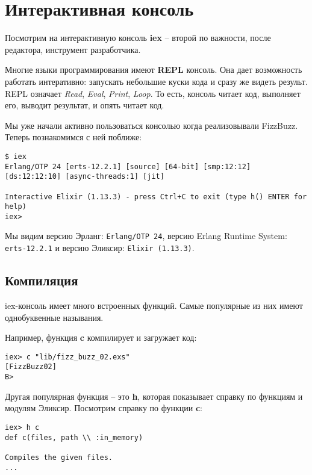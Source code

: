 \chapter{Интерактивная консоль}

Посмотрим на интерактивную консоль \textbf{iex} -- второй по важности, после редактора, инструмент разработчика.

Многие языки программирования имеют \textbf{REPL} консоль. Она дает возможность работать интеративно: запускать небольшие куски кода и сразу же видеть результ. REPL означает \textit{Read}, \textit{Eval}, \textit{Print}, \textit{Loop}. То есть, консоль читает код, выполняет его, выводит результат, и опять читает код.

Мы уже начали активно пользоваться консолью когда реализовывали FizzBuzz. Теперь познакомимся с ней поближе:

\begin{lstlisting}[caption=Запуск консоли, language=ElixirShell, style=elixir-shell]
$ iex
Erlang/OTP 24 [erts-12.2.1] [source] [64-bit] [smp:12:12] [ds:12:12:10] [async-threads:1] [jit]

Interactive Elixir (1.13.3) - press Ctrl+C to exit (type h() ENTER for help)
iex> 
\end{lstlisting}

Мы видим версию Эрланг: \texttt{Erlang/OTP 24}, версию Erlang Runtime System: \texttt{erts-12.2.1} и версию Эликсир: \texttt{Elixir (1.13.3)}.

\section{Компиляция}

iex-консоль имеет много встроенных функций. Самые популярные из них имеют однобуквенные называния. 

Например, функция \textbf{c} компилирует и загружает код:

\begin{lstlisting}[language=ElixirShell, style=elixir-shell]
iex> c "lib/fizz_buzz_02.exs"
[FizzBuzz02]
B>
\end{lstlisting}

Другая популярная функция -- это \textbf{h}, которая показывает справку по функциям и модулям Эликсир. Посмотрим справку по функции \textbf{c}:

\begin{lstlisting}[language=ElixirShell, style=elixir-shell]
iex> h c
def c(files, path \\ :in_memory)                         

Compiles the given files.
...
\end{lstlisting}

